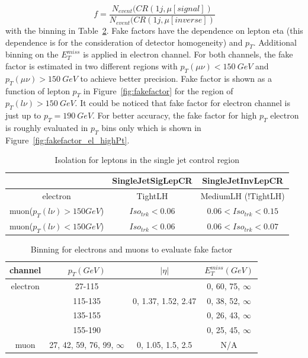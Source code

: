 \begin{equation}
 f = \frac{N_{event}(CR(1j, \mu\left[signal\right])}{N_{event}(CR(1j, \mu\left[inverse\right])}
\end{equation}
with the binning in Table~\ref{tab:FFBinning}. Fake factors have the dependence on lepton eta (this dependence is for the consideration of detector homogeneity) and $p_{T}$. Additional binning on the $E_{T}^{miss}$ is applied in electron channel. For both channels, the fake factor is estimated in two different regions with $p_{T}(\mu\nu)<150~GeV$ and $p_{T}(\mu\nu)>150~GeV$ to achieve better precision. Fake factor is shown as a function of lepton $p_{T}$ in Figure~\ref{fig:fakefactor} for the region of $p_{T}(l\nu)>150~GeV$. It could be noticed that fake factor for electron channel is just up to $p_{T}=190~GeV$. For better accuracy, the fake factor for high $p_{T}$ electron is roughly evaluated in $p_{T}$ bins only which is shown in Figure~\ref{fig:fakefactor_el_highPt}.

\begin{table}[h]
  \caption{Isolation for leptons in the single jet control region} \label{tab:LepIsoCR}
  \begin{center}

    \begin{tabular}{ | c | c | c | }
     \hline
                               &   SingleJetSigLepCR   & SingleJetInvLepCR \\ \hline
    electron                   &        TightLH        & MediumLH (!TightLH) \\ \hline
    muon($p_{T}(l\nu)>150 GeV$) &  $Iso_{trk}<0.06$    & $0.06<Iso_{trk}<0.15$ \\ \hline
    muon($p_{T}(l\nu)<150 GeV$) &  $Iso_{trk}<0.06$    & $0.06<Iso_{trk}<0.07$ \\ \hline
\end{tabular}
\end{center}
\end{table}


\begin{table}[h]
  \caption{Binning for electrons and muons to evaluate fake factor} \label{tab:FFBinning}
\begin{center}

\begin{tabular}{ | c | c | c | c |}
    \hline
    channel  & $p_{T}(GeV)$ & $|\eta|$ & $E_{T}^{miss}(GeV)$ \\ \hline
    electron & 27-115 &  & 0, 60, 75, $\infty$ \\
             & 115-135&0, 1.37, 1.52, 2.47 & 0, 38, 52, $\infty$ \\
             & 135-155& & 0, 26, 43, $\infty$ \\
             & 155-190& & 0, 25, 45, $\infty$ \\ \hline
    muon     & 27, 42, 59, 76, 99, $\infty$ & 0, 1.05, 1.5, 2.5 & N/A \\ \hline

\end{tabular}
\end{center}
\end{table}

